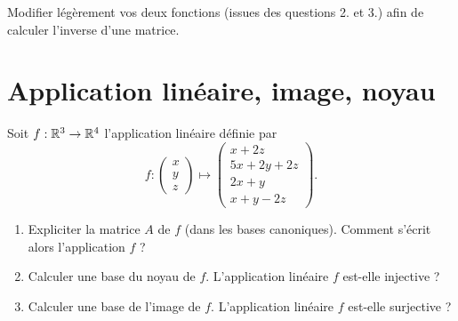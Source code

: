 \begin{frame}
\begin{tp}
\begin{enumerate}
  \vspace*{-2ex} 
  
  Modifier légèrement vos deux fonctions (issues des questions 2. et 3.) afin 
  de calculer l'inverse d'une matrice.
\end{enumerate}
\end{tp}

\end{frame}




\section{Application linéaire, image, noyau}

\begin{frame}
\begin{tp}
Soit $f : \mathbb{R}^3 \to \mathbb{R}^4$ l'application linéaire définie par
$$f : \begin{pmatrix}x\\y\\z\end{pmatrix}
\longmapsto 
\begin{pmatrix}
x+2z\\
5x+2y+2z\\
2x+y\\
x+y-2z
\end{pmatrix}.$$
\begin{enumerate}
  \item Expliciter la matrice $A$ de $f$ (dans les bases canoniques).
  Comment s'écrit alors l'application $f$ ?
    
  \item Calculer une base du noyau de $f$. L'application linéaire
  $f$ est-elle injective ?
  
  \item Calculer une base de l'image de $f$. L'application linéaire
  $f$ est-elle surjective ?
\end{enumerate}
\end{tp}
\end{frame}


